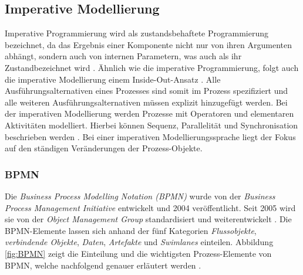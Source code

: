 \subsection{Imperative Modellierung}
Imperative Programmierung wird als zustandsbehaftete Programmierung bezeichnet, da das  Ergebnis einer Komponente nicht nur von ihren Argumenten abhängt, sondern auch von internen Parametern, was auch als ihr \grqq Zustand\grqq bezeichnet wird \cite{fahland2009}.  \newline
Ähnlich wie die imperative Programmierung, folgt auch die imperative Modellierung einem \grqq Inside-Out-Ansatz \grqq. Alle Ausführungsalternativen eines Prozesses sind somit im Prozess spezifiziert und alle weiteren Ausführungsalternativen müssen explizit hinzugefügt werden. Bei der imperativen Modellierung werden Prozesse mit Operatoren und elementaren Aktivitäten modelliert. Hierbei können Sequenz, Parallelität und Synchronisation beschrieben werden \cite{kaschek1998}. Bei einer imperativen Modellierungssprache liegt der Fokus auf den ständigen Veränderungen der Prozess-Objekte.

\subsubsection {BPMN}

Die \textit{Business Process Modelling Notation (BPMN)} wurde von der \textit{Business Process Management Initiative} entwickelt und 2004 veröffentlicht. Seit 2005 wird sie von der \textit{Object Management Group} standardisiert und weiterentwickelt \cite{krallmann2013}.
Die BPMN-Elemente lassen sich anhand der fünf Kategorien \textit{Flussobjekte}, \textit{verbindende Objekte}, \textit{Daten}, \textit{Artefakte} und \textit{Swimlanes} einteilen. Abbildung \ref{fig:BPMN} zeigt die Einteilung und die wichtigsten Prozess-Elemente von BPMN, welche nachfolgend genauer erläutert werden \cite{gpfert2012}. \newline

